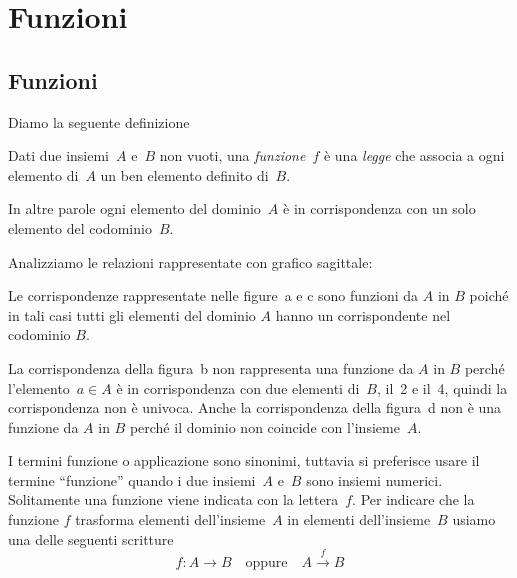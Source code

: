 

\chapter{Funzioni}

\section{Funzioni}

Diamo la seguente definizione

\begin{definizione}\label{def:funzione}
 Dati due insiemi~$A$ e~$B$ non vuoti, una \emph{funzione}~$f$ è una \emph{legge} che associa a ogni elemento di~$A$ un ben elemento definito di~$B$.
\end{definizione}
In altre parole ogni elemento del dominio~$A$ è in corrispondenza con un solo elemento del codominio~$B$.

\begin{exrig}
 \begin{esempio}
\label{ex:8.1}
Analizziamo le relazioni rappresentate con grafico sagittale:
 \begin{center}
  
 \end{center}

Le corrispondenze rappresentate nelle figure~a e c sono funzioni da $A$ in $B$ poiché in tali casi tutti gli elementi del dominio $A$ hanno un corrispondente nel codominio $B$.

La corrispondenza della figura~b non rappresenta una funzione da $A$ in $B$ perché
l'elemento~$a \in A$ è in corrispondenza con due
elementi di~$B$, il~2 e il~4, quindi la corrispondenza non è univoca.
Anche la corrispondenza della figura~d non è una funzione da $A$ in $B$ perché il
dominio non coincide con l'insieme~$A$.
 \end{esempio}
\end{exrig}

I termini funzione o applicazione sono sinonimi, tuttavia si preferisce
usare il termine ``funzione'' quando i due insiemi~$A$ e~$B$ sono insiemi numerici. Solitamente una funzione
viene indicata con la lettera~$f$.
Per indicare che la funzione $f$ trasforma elementi dell'insieme~$A$ in elementi dell'insieme~$B$ usiamo una delle seguenti scritture
\begin{equation*}
f:A \rightarrow B \text{~~~oppure~~~} A\xrightarrow {f}B
\end{equation*}

